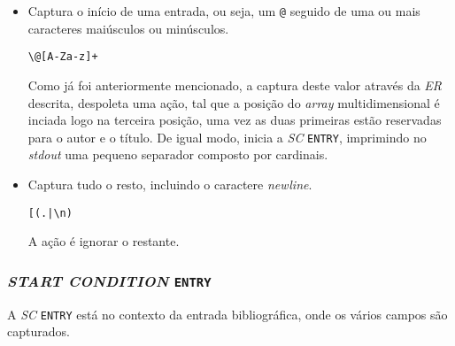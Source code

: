 \begin{itemize}

	\item Captura o início de uma entrada, ou seja, um \texttt{@} seguido de uma
		ou mais caracteres maiúsculos ou minúsculos.

\begin{verbatim}
\@[A-Za-z]+
\end{verbatim}

Como já foi anteriormente mencionado, a captura deste valor através da
\emph{ER} descrita, despoleta uma ação, tal que a posição do \emph{array}
multidimensional é inciada logo na terceira posição, uma vez as duas primeiras
estão reservadas para o autor e o título. De igual modo, inicia a \emph{SC}
\texttt{ENTRY}, imprimindo no \emph{stdout} uma pequeno separador composto por
cardinais.

\item Captura tudo o resto, incluindo o caractere \emph{newline}.

\begin{verbatim}
[(.|\n)                            
\end{verbatim}

A ação é ignorar o restante.



\end{itemize}



\subsubsection{\emph{START CONDITION} \texttt{ENTRY}}

A \emph{SC} \texttt{ENTRY} está no contexto da entrada bibliográfica, onde os
vários campos são capturados. 

